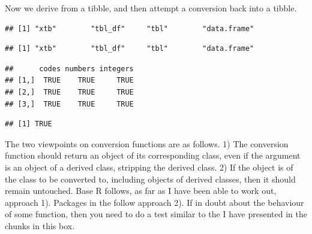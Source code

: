 \documentclass[krantz2]{krantz}\usepackage{knitr}%
\begin{document}
\begin{explainbox}
Now we derive from a tibble, and then attempt a conversion back into a tibble.

\begin{knitrout}\footnotesize
{}\color{fgcolor}\begin{kframe}
\begin{alltt}
 \hlkwb{<-} 
 \hlkwb{<-} \hlstd{(}\hlstd{,} 
\end{alltt}
\begin{verbatim}
## [1] "xtb"        "tbl_df"     "tbl"        "data.frame"
\end{verbatim}
\begin{alltt}
 \hlkwb{<-} 
\end{alltt}
\begin{verbatim}
## [1] "xtb"        "tbl_df"     "tbl"        "data.frame"
\end{verbatim}
\begin{alltt}
 \hlopt{==} 
\end{alltt}
\begin{verbatim}
##      codes numbers integers
## [1,]  TRUE    TRUE     TRUE
## [2,]  TRUE    TRUE     TRUE
## [3,]  TRUE    TRUE     TRUE
\end{verbatim}
\begin{alltt}
\end{alltt}
\begin{verbatim}
## [1] TRUE
\end{verbatim}
\end{kframe}
\end{knitrout}

The two viewpoints on conversion functions are as follows. 1) The conversion function should return an object of its corresponding class, even if the argument is an object of a derived class, stripping the derived class. 2) If the object is of the class to be converted to, including objects of derived classes, then it should remain untouched. Base R follows, as far as I have been able to work out, approach 1). Packages in the  follow approach 2). If in doubt about the behaviour of some function, then you need to do a test similar to the I have presented in the chunks in this box.
\end{explainbox}
\end{document}
